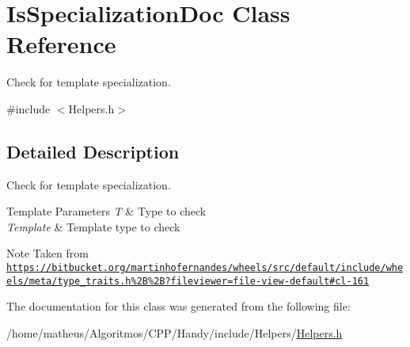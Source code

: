 \hypertarget{classIsSpecializationDoc}{}\section{Is\+Specialization\+Doc Class Reference}
\label{classIsSpecializationDoc}


Check for template specialization.  




{\ttfamily \#include $<$Helpers.\+h$>$}



\subsection{Detailed Description}
Check for template specialization. 


\begin{DoxyTemplParams}{Template Parameters}
{\em T} & Type to check \\
\hline
{\em Template} & Template type to check \\
\hline
\end{DoxyTemplParams}
\begin{DoxyNote}{Note}
Taken from \href{https://bitbucket.org/martinhofernandes/wheels/src/default/include/wheels/meta/type_traits.h%2B%2B?fileviewer=file-view-default#cl-161}{\tt https\+://bitbucket.\+org/martinhofernandes/wheels/src/default/include/wheels/meta/type\+\_\+traits.\+h\%2\+B\%2\+B?fileviewer=file-\/view-\/default\#cl-\/161} 
\end{DoxyNote}


The documentation for this class was generated from the following file\+:\begin{DoxyCompactItemize}
\item 
/home/matheus/\+Algoritmos/\+C\+P\+P/\+Handy/include/\+Helpers/\hyperlink{Helpers_2Helpers_8h}{Helpers.\+h}\end{DoxyCompactItemize}
